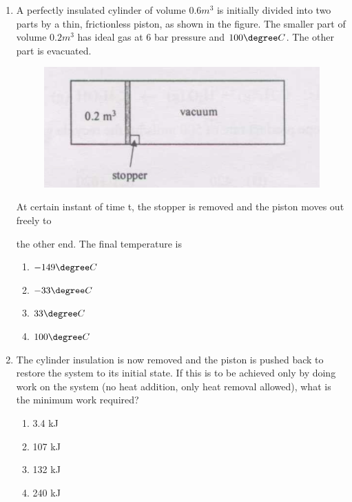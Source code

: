 \documentclass[journal,12pt,onecolumn]{IEEEtran}
\theoremstyle{remark}
\begin{document}
\begin{enumerate}
    \begin{multicols}{4}
        \begin{enumerate}
            \item 63.3
            \item 73.3
            \item 83.3
            \item 93.3
        \end{enumerate}
    \end{multicols}

    \item A perfectly insulated cylinder of volume $0.6 m^3$ is initially divided into two parts by a thin, frictionless piston, as shown in the figure. The smaller part of volume $0.2 m^3$ has ideal gas at 6 bar pressure and $100\degree C$. The other part is evacuated.
    \begin{figure}[H]
        \centering
        \includegraphics[width=0.5\columnwidth]{figs/82.png}
        \caption{}
        \label{fig:82}
    \end{figure}

At certain instant of time t, the stopper is removed and the piston moves out freely to

the other end. The final temperature is

\begin{multicols}{4}
    \begin{enumerate}
        \item $-149\degree C$
          \item $-33\degree C$
            \item $33\degree C$
              \item $100\degree C$
    \end{enumerate}
\end{multicols}

    \item The cylinder insulation is now removed and the piston is pushed back to restore the system to its initial state. If this is to be achieved only by doing work on the system (no heat addition, only heat removal allowed), what is the minimum work required?

    \begin{multicols}{4}
        \begin{enumerate}
            \item 3.4 kJ
            \item 107 kJ
            \item 132 kJ
            \item 240 kJ
        \end{enumerate}
    \end{multicols}


\end{enumerate}
\end{document}
